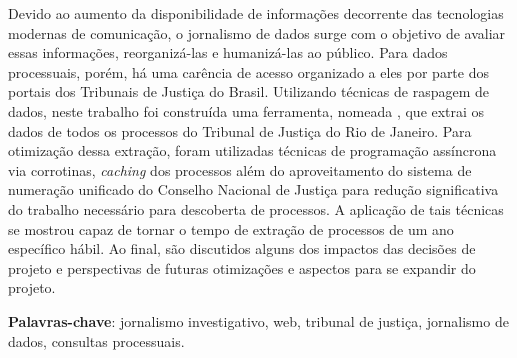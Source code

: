 \begin{resumo}
    Devido ao aumento da disponibilidade de informações decorrente das
    tecnologias modernas de comunicação, o jornalismo de dados surge com o
    objetivo de avaliar essas informações, reorganizá-las e humanizá-las ao
    público. Para dados processuais, porém, há uma carência de acesso
    organizado a eles por parte dos portais dos Tribunais de Justiça do Brasil.
    Utilizando técnicas de raspagem de dados, neste trabalho foi construída uma
    ferramenta, nomeada \tjscraper, que extrai os dados de todos os processos
    do Tribunal de Justiça do Rio de Janeiro. Para otimização dessa extração,
    foram utilizadas técnicas de programação assíncrona via corrotinas,
    \textit{caching} dos processos além do aproveitamento do sistema de
    numeração unificado do Conselho Nacional de Justiça para redução
    significativa do trabalho necessário para descoberta de processos. A
    aplicação de tais técnicas se mostrou capaz de tornar o tempo de extração
    de processos de um ano específico hábil. Ao final, são discutidos alguns
    dos impactos das decisões de projeto e perspectivas de futuras otimizações
    e aspectos para se expandir do projeto.

    \vspace{\onelineskip}
    \noindent
    \textbf{Palavras-chave}: jornalismo investigativo, web, tribunal de
    justiça, jornalismo de dados, consultas processuais.
\end{resumo}

\afterpage{\null\newpage}
